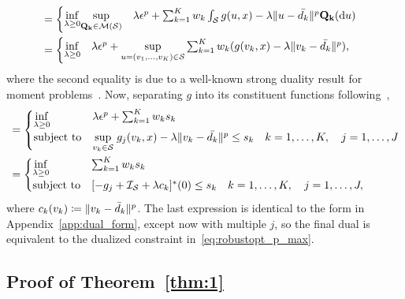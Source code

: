 \documentclass[12pt]{article}
\newcommand{\citep}{\cite}
\theoremstyle{thmstyleone}%
\theoremstyle{thmstyletwo}%
\theoremstyle{thmstylethree}%
\newcommand{\reviewChanges}{}
\begin{document}
\begin{appendices}
\begin{equation*}
\begin{aligned}
	&= \begin{cases}
		\underset{\lambda \geq 0}{\inf} \underset{\mathbf{Q_k} \in \mathcal{M}(\supp)}{\sup} \quad \lambda\epsilon^p +  \sum_{k = 1}^K w_k \int_\reviewChanges{\supp} g(u,x)-\lambda\|u - \bar{d_k}\|^p \mathbf{Q_k}(\dif u)\\
\end{cases}\\
&= \begin{cases}
	\underset{\lambda \geq 0}{\inf} \quad \lambda \epsilon^p +  \underset{u = (v_1,\dots,v_K) \in \supp}{\sup} \sum_{k = 1}^K w_k (g(v_k,x)-\lambda\|v_k - \bar{d_k}\|^p),\\
\end{cases}
\end{aligned}
\end{equation*}
where the second equality is due to a well-known strong duality result for moment problems~\citep{mohajerin_esfahani_data-driven_2018}. \reviewChanges{Now, separating $g$ into its constituent functions following~\citep[Theorem 4.2]{mohajerin_esfahani_data-driven_2018},
\begin{equation*}
	\begin{aligned}
&= \begin{cases}
	\underset{\lambda \geq 0}{\inf} & \lambda\epsilon^p + \sum_{k=1} ^K  w_k s_k \\
	\mbox{subject to} &  \underset{v_k\in \mathcal{S}}{\sup}\hspace{1mm} g_j(v_k, x) -\lambda \|v_k - \bar{d_k}\|^p  \le s_k \quad k = 1,\dots,K,\quad j = 1,\dots,J
\end{cases}\\
&= \begin{cases}
	\underset{\lambda \geq 0}{\inf} & \sum_{k=1} ^K  w_k s_k \\
	\mbox{subject to} &  [-g_j +\mathcal{I}_{\mathcal{S}} + \lambda c_k]^*(0)  \le s_k \quad k = 1,\dots,K,\quad j = 1,\dots,J,
\end{cases}
\end{aligned}
\end{equation*}
where $c_k(v_k) \coloneqq   \| v_k - \bar{d}_k \|^p$. The last expression is identical to the form in Appendix~\ref{app:dual_form}, except now with multiple $j$, so the final dual is equivalent to the dualized constraint in~\eqref{eq:robustopt_p_max}.}

\ifpreprint
\subsection{Proof of Theorem~\ref{thm:1}}
\else

\end{appendices}
\end{document}

